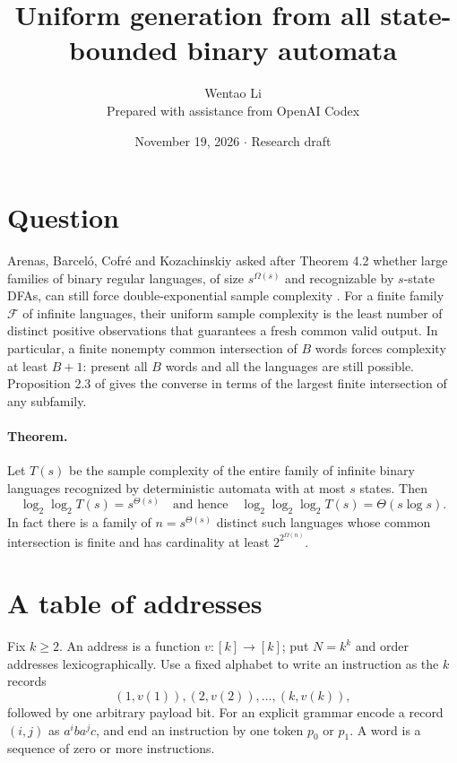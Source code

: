 \documentclass[11pt]{article}
\title{Uniform generation from all state-bounded binary automata}
\author{Wentao Li\\{\small Prepared with assistance from OpenAI Codex}}
\date{November 19, 2026 \quad $\cdot$ \quad Research draft}
\begin{document}
\maketitle
\section*{Question}
Arenas, Barcel\'o, Cofr\'e and Kozachinskiy asked after Theorem 4.2 whether large families of binary regular languages, of size $s^{\Omega(s)}$ and recognizable by $s$-state DFAs, can still force double-exponential sample complexity \cite{abck}. For a finite family $\mathcal F$ of infinite languages, their uniform sample complexity is the least number of distinct positive observations that guarantees a fresh common valid output. In particular, a finite nonempty common intersection of $B$ words forces complexity at least $B+1$: present all $B$ words and all the languages are still possible. Proposition 2.3 of \cite{abck} gives the converse in terms of the largest finite intersection of any subfamily.

\paragraph{Theorem.} Let $T(s)$ be the sample complexity of the entire family of infinite binary languages recognized by deterministic automata with at most $s$ states. Then
\[
  \log_2\log_2 T(s)=s^{\Theta(s)}
  \quad\text{and hence}\quad
  \log_2\log_2\log_2 T(s)=\Theta(s\log s).
\]
In fact there is a family of $n=s^{\Theta(s)}$ distinct such languages whose common intersection is finite and has cardinality at least $2^{2^{\Omega(n)}}$.

\section*{A table of addresses}
Fix $k\ge2$. An address is a function $v:[k]\to[k]$; put $N=k^k$ and order addresses lexicographically. Use a fixed alphabet to write an instruction as the $k$ records
\[
 (1,v(1)),(2,v(2)),\ldots,(k,v(k)),
\]
followed by one arbitrary payload bit. For an explicit grammar encode a record $(i,j)$ as $a^i b a^j c$, and end an instruction by one token $p_0$ or $p_1$. A word is a sequence of zero or more instructions.
\end{document}
